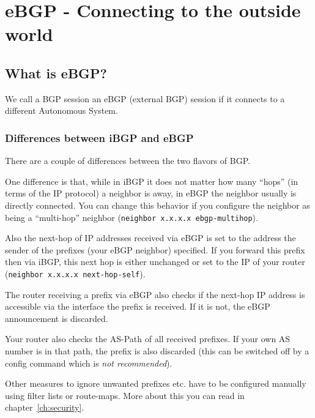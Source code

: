 \chapter{eBGP - Connecting to the outside world}
\label{ch:eBGP}
\section{What is eBGP?}
We call a BGP session an eBGP (external BGP) session if it connects to a different Autonomous System.

\subsection{Differences between iBGP and eBGP}
There are a couple of differences between the two flavors of BGP.

One difference is that, while in iBGP it does not matter how many ``hops'' (in terms of the IP protocol) a neighbor is away, in eBGP the neighbor usually is directly connected.  You can change this behavior if you configure the neighbor as being a ``multi-hop'' neighbor (\texttt{neighbor x.x.x.x ebgp-multihop}).


Also the next-hop of IP addresses received via eBGP is set to the address the sender of the prefixes (your eBGP neighbor) specified. If you forward this prefix then via iBGP, this next hop is either unchanged or set to the IP of your router (\texttt{neighbor x.x.x.x next-hop-self}).

The router receiving a prefix via eBGP also checks if the next-hop IP address is accessible via the interface the prefix is received. If it is not, the eBGP announcement is discarded.

Your router also checks the AS-Path of all received prefixes. If your own AS number is in that path, the prefix is also discarded (this can be switched off by a config command which is \emph{not recommended}).

Other measures to ignore unwanted prefixes etc. have to be configured manually using filter lists or route-maps. More about this you can read in chapter~\ref{ch:security}.


